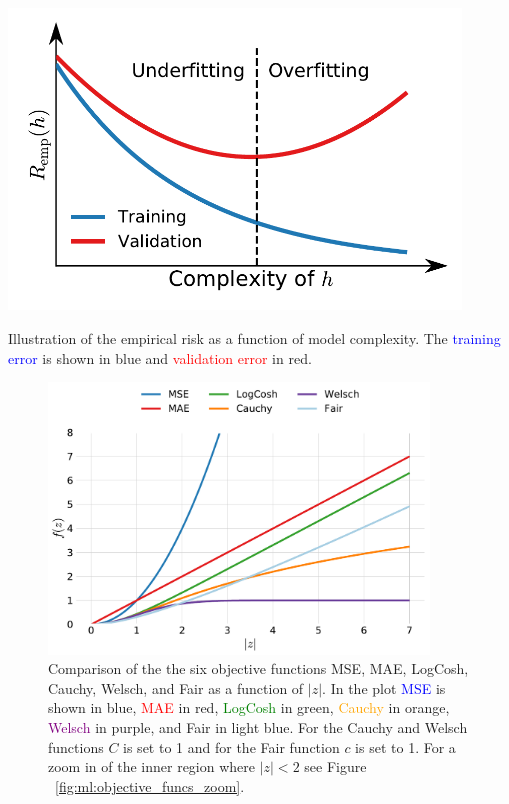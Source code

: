 \documentclass[a4paper, twoside]{tufte-book}
\newcommand{\figref}[1]{Figure ~\ref{#1}}
\begin{document}
\begin{marginfigure}
  \includegraphics[width=0.9\textwidth]{figures/overfitting/overfitting_1.pdf}
  \caption[Illustration of the empirical risk as a function of model complexity.]
    {Illustration of the empirical risk as a function of model complexity. The \textcolor{blue}{training error} is shown in blue and \textcolor{red}{validation error} in red.
    }
  \label{fig:ml:empirical_risk}
\end{marginfigure}


\begin{figure}
  \includegraphics[width=0.9\textwidth]{figures/objective_functions/objective_functions.pdf}
  \caption[Comparison of different objective functions.]
    {Comparison of the the six objective functions MSE, MAE, LogCosh, Cauchy, Welsch, and Fair as a function of $|z|$. In the plot \textcolor{blue}{MSE} is shown in blue, \textcolor{red}{MAE} in red, \textcolor{green}{LogCosh} in green, \textcolor{orange}{Cauchy} in orange, \textcolor{purple}{Welsch} in purple, and \textcolor{light-blue}{Fair} in light blue. For the Cauchy and Welsch functions $C$ is set to 1 and for the Fair function $c$ is set to 1. For a zoom in of the inner region where $|z|<2$ see \figref{fig:ml:objective_funcs_zoom}. 
    }
  \label{fig:ml:objective_funcs}
\end{figure}
\end{document}
